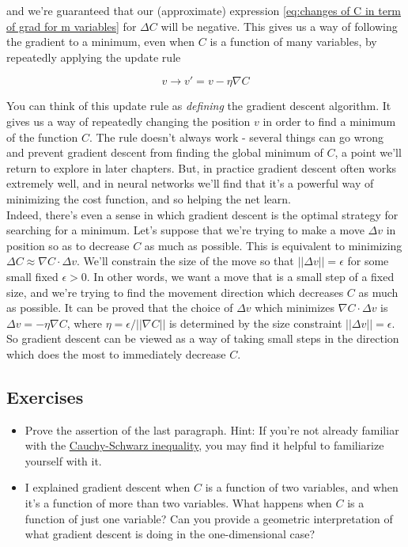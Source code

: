 and we're guaranteed that our (approximate) expression \ref{eq:changes of C in term of grad for m variables} for $\Delta C$ will be negative. This gives us a way of following the gradient to a minimum, even when $C$ is a function of many variables, by repeatedly applying the update rule

\begin{equation}
v\rightarrow v'=v-\eta\nabla C
\label{eq: change of v for m variables}
\end{equation}

You can think of this update rule as \textit{defining} the gradient descent algorithm. It gives us a way of repeatedly changing the position $v$ in order to find a minimum of the function $C$. The rule doesn't always work - several things can go wrong and prevent gradient descent from finding the global minimum of $C$, a point we'll return to explore in later chapters. But, in practice gradient descent often works extremely well, and in neural networks we'll find that it's a powerful way of minimizing the cost function, and so helping the net learn.\\

Indeed, there's even a sense in which gradient descent is the optimal strategy for searching for a minimum. Let's suppose that we're trying to make a move $\Delta v$ in position so as to decrease $C$ as much as possible. This is equivalent to minimizing $\Delta C\approx \nabla C \cdot \Delta v$. We'll constrain the size of the move so that $||\Delta v||=\epsilon$ for some small fixed $\epsilon>0$. In other words, we want a move that is a small step of a fixed size, and we're trying to find the movement direction which decreases $C$ as much as possible. It can be proved that the choice of $\Delta v$ which minimizes $\nabla C\cdot \Delta v$ is $\Delta v =-\eta\nabla C$, where $\eta=\epsilon/||\nabla C||$ is determined by the size constraint $||\Delta v||=\epsilon$. So gradient descent can be viewed as a way of taking small steps in the direction which does the most to immediately decrease $C$.\\
 
\subsection*{Exercises}
\label{subs: Exercises Chauchy-Schwarz}

\begin{itemize}
\item Prove the assertion of the last paragraph. Hint: If you're not already familiar with the \href{https://en.wikipedia.org/wiki/Cauchy\%E2\%80\%93Schwarz_inequality}{Cauchy-Schwarz inequality}, you may find it helpful to familiarize yourself with it.
\item I explained gradient descent when $C$ is a function of two variables, and when it's a function of more than two variables. What happens when $C$ is a function of just one variable? Can you provide a geometric interpretation of what gradient descent is doing in the one-dimensional case?
\end{itemize}

